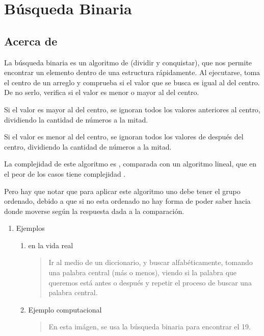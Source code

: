 \documentclass[letterpaper,10pt,spanish]{sphinxmanual}
\begin{document}
\section{Búsqueda Binaria}
\label{\detokenize{busqueda/binaria:busqueda-binaria}}\label{\detokenize{busqueda/binaria::doc}}

\subsection{Acerca de}
\label{\detokenize{busqueda/binaria:acerca-de}}
La búsqueda binaria es un algoritmo de  (dividir y
conquistar), que nos permite encontrar un elemento dentro de una
estructura  rápidamente. Al ejecutarse, toma el centro de un
arreglo y comprueba si el valor que se busca es igual al del centro. De
no serlo, verifica si el valor es menor o mayor al del centro.

Si el valor es mayor al del centro, se ignoran todos los valores
anteriores al centro, dividiendo la cantidad de números a la mitad.

Si el valor es menor al del centro, se ignoran todos los valores de
después del centro, dividiendo la cantidad de números a la mitad.

La complejidad de este algoritmo es , comparada con un
algoritmo lineal, que en el peor de los casos tiene complejidad
.

Pero hay que notar que para aplicar este algoritmo uno debe tener el grupo ordenado, debido a que si no esta ordenado no hay forma de poder saber hacia donde moverse según la respuesta dada a la comparación.
\begin{enumerate}
%
\item {} 
Ejemplos
\begin{enumerate}
%
\item {} 
en la vida real
\begin{quote}

Ir al medio de un diccionario, y buscar alfabéticamente, tomando
una palabra central (más o menos), viendo si la palabra que
queremos está antes o después y repetir el proceso de buscar una
palabra central.
\end{quote}

\item {} 
Ejemplo computacional
\begin{quote}

En esta imágen, se usa la búsqueda binaria para encontrar el 19.
\end{quote}

\end{enumerate}

\end{enumerate}
\end{document}
